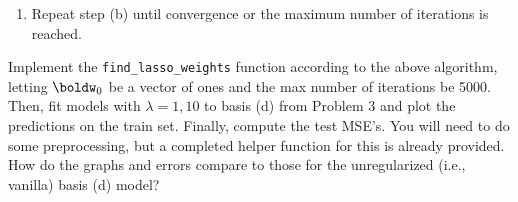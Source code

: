 \documentclass[submit]{../harvardml}
\begin{document}
\begin{problem}
\begin{enumerate}
\begin{enumerate}
\begin{enumerate}
                \item If $d=1$, set $w_1 = \frac{\rho_1}{||\tilde{\boldx}_1||^2_2}$. Otherwise if $d\ne 1$, compute $w_d = \frac{\text{sign}(\rho_d)\max\left\{|\rho_d|-\frac{\lambda}{2}, 0\right\}}{||\tilde{\boldx}_d||^2_2}$.
            \end{enumerate}
            \item Repeat step (b) until convergence or the maximum number of iterations is reached.
        \end{enumerate}

        Implement the \texttt{find\_lasso\_weights} function according to the above algorithm, letting $\boldw_0$ be a vector of ones and the max number of iterations be 5000. Then, fit models with $\lambda=1, 10$ to basis (d) from Problem 3 and plot the predictions on the train set. Finally, compute the test MSE's. You will need to do some preprocessing, but a completed helper function for this is already provided. How do the graphs and errors compare to those for the unregularized (i.e., vanilla) basis (d) model?
    \end{enumerate}
\end{problem}

\newpage
\end{document}
